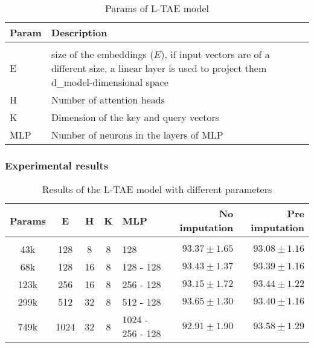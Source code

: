 \begin{table}[ht]
  \centering
  \begin{tabular}{l p{12cm}}   
     Param & Description \\[0.2cm] 
     \hline \\[-0.2cm]  
     E & size of the embeddings ($E$), if input vectors are of a different size, a linear layer is used to project them d\_model-dimensional space \\
     H & Number of attention heads  \\
     K & Dimension of the key and query vectors  \\
     MLP & Number of neurons in the layers of MLP \\
  \end{tabular}
  \caption{Params of L-TAE model}
  \label{tab:LTAEconfig}
\end{table} 

\subsubsection{Experimental results}

\begin{table}[ht]
  \centering
  \begin{tabular}{cccclrr} 
     Params & E & H & K & MLP & No imputation & Pre imputation\\[0.2cm] 
     \hline \\[-0.2cm] 
     43k & 	128 & 	8 & 	8 & 	128 & 	$93.37 \pm 1.65$ & 	$93.08 \pm 1.16$\\ 
     68k & 	128 & 	16 & 	8 & 	128 - 128 & 	$93.43 \pm 1.37$ & 	$93.39 \pm 1.16$\\ 
     123k & 	256 & 	16 & 	8 & 	256 - 128 & 	$93.15 \pm 1.72$ & 	$93.44 \pm 1.22$\\ 
     299k & 	512 & 	32 & 	8 & 	512 - 128 & 	$\mathbf{93.65 \pm 1.30}$ & 	$93.40 \pm 1.16$\\ 
     749k & 	1024 & 	32 & 	8 & 	1024 - 256 - 128 & 	$92.91 \pm 1.90$ & 	$\mathbf{93.58 \pm 1.29}$\\ 
  \end{tabular}
  \caption{Results of the L-TAE model with different parameters}
  \label{tab:LTAEresults}
\end{table}